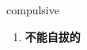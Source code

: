 
\begin{frame}
{\huge compulsive}
\begin{center}
\begin{enumerate}\Large
  \item \textbf{不能自拔的}
\end{enumerate}
\end{center}
\end{frame}
